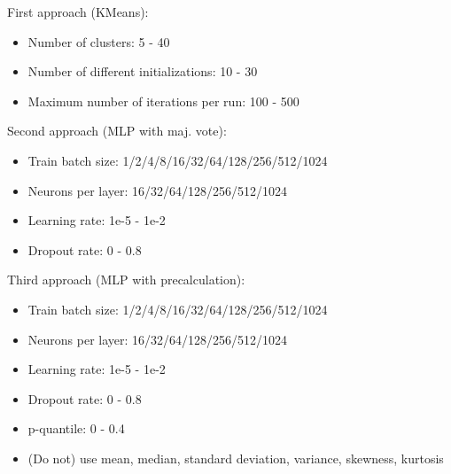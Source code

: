 \documentclass{article}
\begin{document}
First approach (KMeans):
\begin{itemize}
\item Number of clusters: 5 - 40
\item Number of different initializations: 10 - 30
\item Maximum number of iterations per run: 100 - 500
\end{itemize}

Second approach (MLP with maj. vote):
\begin{itemize}
\item Train batch size: 1/2/4/8/16/32/64/128/256/512/1024
\item Neurons per layer: 16/32/64/128/256/512/1024
\item Learning rate: 1e-5 - 1e-2
\item Dropout rate: 0 - 0.8
\end{itemize}

Third approach (MLP with precalculation):
%
\begin{itemize}
\item Train batch size: 1/2/4/8/16/32/64/128/256/512/1024
\item Neurons per layer: 16/32/64/128/256/512/1024
\item Learning rate: 1e-5 - 1e-2
\item Dropout rate: 0 - 0.8
\item p-quantile: 0 - 0.4
\item (Do not) use mean, median, standard deviation, variance, skewness, kurtosis
\end{itemize}
%
\end{document}
